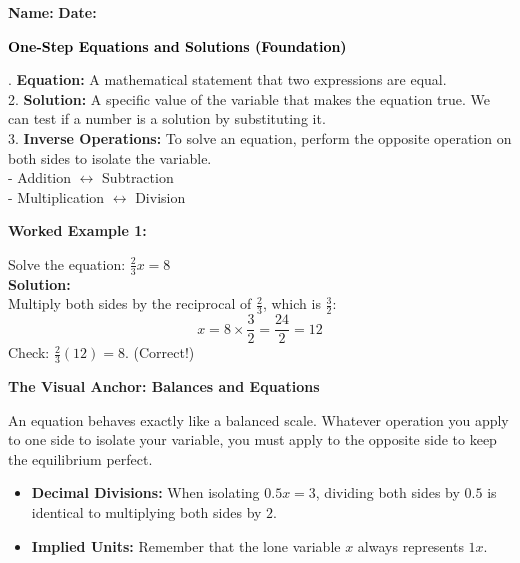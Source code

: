 \documentclass[12pt, letterpaper, fleqn]{article}
\begin{document}
\textbf{Name:} \underline{\hspace{5cm}}
\hfill
\textbf{Date:} \underline{\hspace{3cm}}\\

\begin{tcolorbox}[colback=black!10]
    \large\textcolor{black}{\textbf{One-Step Equations and Solutions (Foundation)}}
\end{tcolorbox}

\vspace{3mm}

. \textbf{Equation:} A mathematical statement that two expressions are equal. \\
2. \textbf{Solution:} A specific value of the variable that makes the equation true. We can test if a number is a solution by substituting it. \\
3. \textbf{Inverse Operations:} To solve an equation, perform the opposite operation on both sides to isolate the variable. \\
- Addition $\leftrightarrow$ Subtraction \\
- Multiplication $\leftrightarrow$ Division

\vspace{4mm}

\begin{tcolorbox}[colback=white, colframe=black!25, boxrule=0.6pt, arc=4mm, left=6mm, right=6mm, top=5mm, bottom=5mm]
\textbf{Worked Example 1:}

\medskip
\noindent
Solve the equation: $\frac{2}{3}x = 8$\\
\textbf{Solution:} \\
Multiply both sides by the reciprocal of $\frac{2}{3}$, which is $\frac{3}{2}$:\\
$$x = 8 \times \frac{3}{2} = \frac{24}{2} = 12$$
Check: $\frac{2}{3}(12) = 8$. (Correct!)
\end{tcolorbox}

\vspace{4mm}

\small
\begin{tcolorbox}[colback=white, colframe=black!25, boxrule=0.8pt]
\textbf{The Visual Anchor: Balances and Equations}

\medskip
An equation behaves exactly like a balanced scale. Whatever operation you apply to one side to isolate your variable, you must apply to the opposite side to keep the equilibrium perfect.
\begin{itemize}[itemsep=4pt]
    \item \textbf{Decimal Divisions:} When isolating $0.5x = 3$, dividing both sides by $0.5$ is identical to multiplying both sides by $2$. 
    \item \textbf{Implied Units:} Remember that the lone variable $x$ always represents $1x$.
\end{itemize}
\end{tcolorbox}
\end{document}
